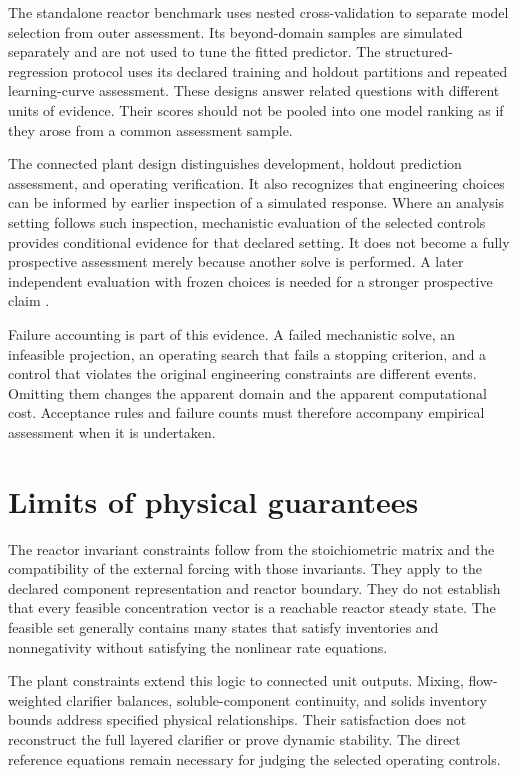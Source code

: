 The standalone reactor benchmark uses nested cross-validation to separate model selection from outer assessment. Its beyond-domain samples are simulated separately and are not used to tune the fitted predictor. The structured-regression protocol uses its declared training and holdout partitions and repeated learning-curve assessment. These designs answer related questions with different units of evidence. Their scores should not be pooled into one model ranking as if they arose from a common assessment sample.

The connected plant design distinguishes development, holdout prediction assessment, and operating verification. It also recognizes that engineering choices can be informed by earlier inspection of a simulated response. Where an analysis setting follows such inspection, mechanistic evaluation of the selected controls provides conditional evidence for that declared setting. It does not become a fully prospective assessment merely because another solve is performed. A later independent evaluation with frozen choices is needed for a stronger prospective claim \citep{Kaufman2012,Zhang2026}.

Failure accounting is part of this evidence. A failed mechanistic solve, an infeasible projection, an operating search that fails a stopping criterion, and a control that violates the original engineering constraints are different events. Omitting them changes the apparent domain and the apparent computational cost. Acceptance rules and failure counts must therefore accompany empirical assessment when it is undertaken.

\section{Limits of physical guarantees}

The reactor invariant constraints follow from the stoichiometric matrix and the compatibility of the external forcing with those invariants. They apply to the declared component representation and reactor boundary. They do not establish that every feasible concentration vector is a reachable reactor steady state. The feasible set generally contains many states that satisfy inventories and nonnegativity without satisfying the nonlinear rate equations.

The plant constraints extend this logic to connected unit outputs. Mixing, flow-weighted clarifier balances, soluble-component continuity, and solids inventory bounds address specified physical relationships. Their satisfaction does not reconstruct the full layered clarifier or prove dynamic stability. The direct reference equations remain necessary for judging the selected operating controls.

